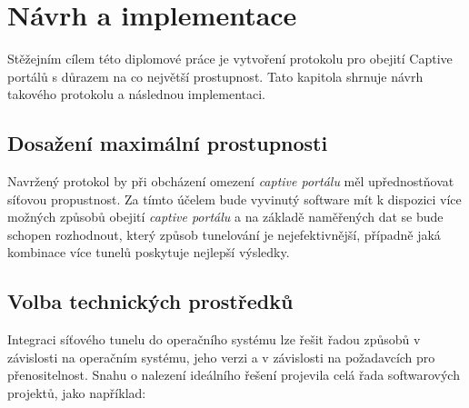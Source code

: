 \documentclass[thesis=M,czech]{FITthesis}[2012/10/20]
\begin{document}






\chapter{Návrh a implementace}

Stěžejním cílem této diplomové práce je vytvoření protokolu pro obejití Captive portálů s důrazem na co největší prostupnost. Tato kapitola shrnuje návrh takového protokolu a následnou implementaci.


\section{Dosažení maximální prostupnosti}

Navržený protokol by při obcházení omezení \textit{captive portálu} měl upřednostňovat síťovou propustnost. Za tímto účelem bude vyvinutý software mít k dispozici více možných způsobů obejití \textit{captive portálu} a na základě naměřených dat se bude schopen rozhodnout, který způsob tunelování je nejefektivnější, případně jaká kombinace více tunelů poskytuje nejlepší výsledky.



\section{Volba technických prostředků}

Integraci síťového tunelu do operačního systému lze řešit řadou způsobů v závislosti na operačním systému, jeho verzi a v závislosti na požadavcích pro přenositelnost. Snahu o nalezení ideálního řešení projevila celá řada softwarových projektů, jako například:
\end{document}
